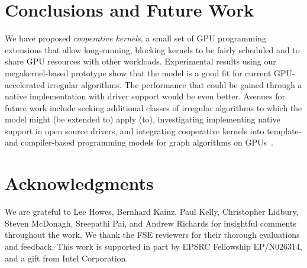 \documentclass[sigconf]{acmart}
\begin{document}
{%

%


\section{Conclusions and Future Work}\label{sec:conclusion}

We have proposed \emph{cooperative kernels}, a small set of GPU
programming extensions that allow long-running, blocking kernels to be
fairly scheduled and to share GPU resources with other workloads.
Experimental results using our megakernel-based prototype show that
the model is a good fit for current GPU-accelerated irregular
algorithms.  The performance that could be gained through a native
implementation with driver support would be even better.
%
Avenues for future work include seeking additional classes of
irregular algorithms to which the model might (be extended to) apply
(to), investigating implementing native support in open source
drivers, and integrating cooperative kernels into template- and
compiler-based programming models for graph algorithms on
GPUs~\cite{DBLP:conf/ppopp/WangDPWRO16,DBLP:conf/oopsla/PaiP16}.

\section*{Acknowledgments}
We are grateful to Lee Howes, Bernhard Kainz, Paul Kelly, Christopher
Lidbury, Steven McDonagh, Sreepathi Pai, and Andrew Richards for
insightful comments throughout the work. We thank the FSE reviewers
for their thorough evaluations and feedback. This work is supported in
part by EPSRC Fellowship EP/N026314, and a gift from Intel Corporation.


}
\end{document}
